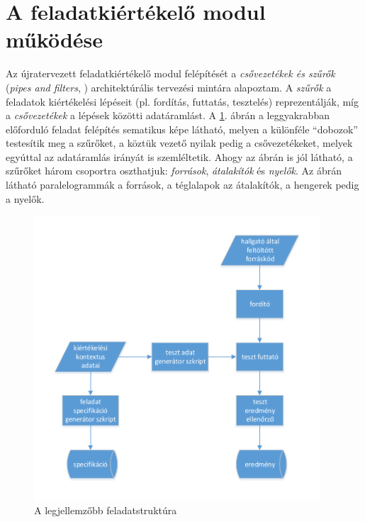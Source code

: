\section{A feladatkiértékelő modul működése}\label{section:execution-procedure}
Az újratervezett feladatkiértékelő modul felépítését a \textit{csővezetékek és szűrők} (\textit{pipes and filters}, \cite{PipesAndFilters}) architektúrális tervezési mintára alapoztam.
A \textit{szűrők} a feladatok kiértékelési lépéseit (pl. fordítás, futtatás, tesztelés) reprezentálják, míg a \textit{csővezetékek} a lépések közötti adatáramlást.
A \ref{figure:example-pipeline}. ábrán a leggyakrabban előforduló feladat felépítés sematikus képe látható, melyen a különféle ``dobozok'' testesítik meg a szűrőket, a köztük vezető nyilak pedig a csővezetékeket, melyek egyúttal az adatáramlás irányát is szemléltetik.
Ahogy az ábrán is jól látható, a szűrőket három csoportra oszthatjuk: \textit{források}, \textit{átalakítók} és \textit{nyelők}.
Az ábrán látható paralelogrammák a források, a téglalapok az átalakítók, a hengerek pedig a nyelők.

\begin{figure}[h]
    \centering
    \includegraphics[width=0.95\textwidth]{figures/example-pipeline}
    \caption{A legjellemzőbb feladatstruktúra}
    \label{figure:example-pipeline}
\end{figure}

